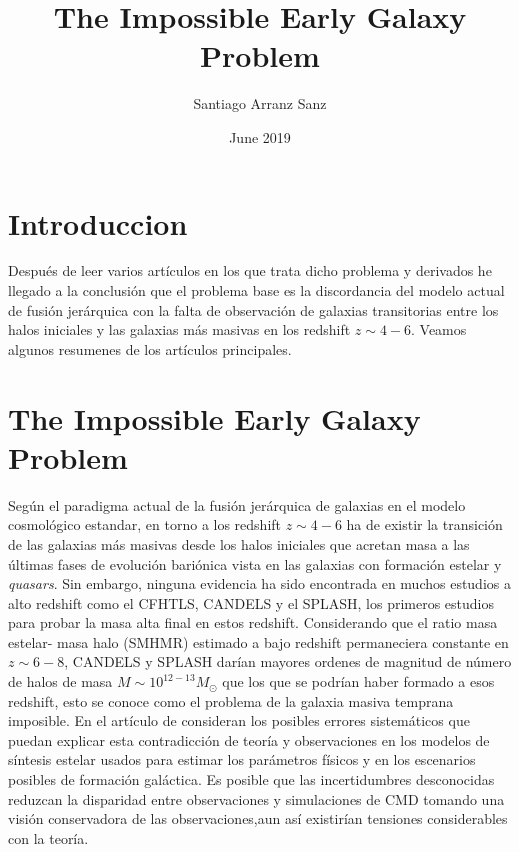 \documentclass{article}
\title{The Impossible  Early Galaxy Problem}
\author{Santiago Arranz Sanz }
\date{June 2019}
\begin{document}
\maketitle

\section*{Introduccion}

Después de leer varios artículos en los que trata dicho problema y derivados he llegado a la conclusión que el problema base es la discordancia del modelo actual de fusión jerárquica con la falta de observación de galaxias transitorias entre los halos iniciales y las galaxias más masivas en los redshift $z\sim 4-6$. Veamos algunos resumenes de los artículos principales.

\section*{The Impossible Early Galaxy Problem}
\citep{steinhardt2016impossibly} Según el paradigma actual de la fusión jerárquica de galaxias en el modelo cosmológico estandar, en torno a los redshift $z\sim 4-6$ ha de existir la transición de las galaxias más masivas desde los halos iniciales que acretan masa a las últimas fases de evolución bariónica vista en las galaxias con formación estelar y \textit{quasars}. Sin embargo, ninguna evidencia ha sido encontrada en muchos estudios a alto redshift como el CFHTLS, CANDELS y el SPLASH, los primeros estudios para probar la masa alta final en estos redshift. Considerando que el ratio masa estelar- masa halo (SMHMR) estimado a bajo redshift permaneciera constante en $z\sim 6-8$, CANDELS y SPLASH darían mayores ordenes de magnitud de número de halos de masa $M\sim 10^{12-13}M_\odot$ que los que se podrían haber formado a esos redshift, esto se conoce como el problema de la galaxia masiva temprana imposible. En el artículo de \cite{steinhardt2016impossibly} consideran los posibles errores sistemáticos que puedan explicar esta contradicción de teoría y observaciones en los modelos de síntesis estelar usados para estimar los parámetros físicos  y en los escenarios posibles de formación galáctica. Es posible que las incertidumbres desconocidas reduzcan la disparidad entre observaciones y simulaciones de CMD tomando una visión conservadora de las observaciones,aun así existirían tensiones considerables con la teoría.\\
\end{document}
